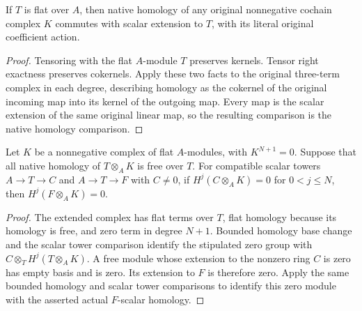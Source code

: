 \begin{lemma}
\label{lem:relative-arithmetic-flat-scalar-homology}
\leanok
If $T$ is flat over $A$, then native homology of any original nonnegative
cochain complex $K$ commutes with scalar extension to $T$, with its
literal original coefficient action.
\end{lemma}
\begin{proof}
Tensoring with the flat $A$-module $T$ preserves kernels. Tensor right
exactness preserves cokernels. Apply these two facts to the original
three-term complex in each degree, describing homology as the cokernel
of the original incoming map into its kernel of the outgoing map.
Every map is the scalar extension of the same original linear map,
so the resulting comparison is the native homology comparison.
\end{proof}

\begin{theorem}
\label{thm:relative-arithmetic-free-scalar-homology}
\leanok
Let $K$ be a nonnegative complex of flat $A$-modules, with $K^{N+1}=0$.
Suppose that all native homology of $T\otimes_A K$ is free over $T$.
For compatible scalar towers $A\to T\to C$ and $A\to T\to F$ with
$C\ne0$, if $H^j(C\otimes_A K)=0$ for $0<j\leq N$, then
$H^j(F\otimes_A K)=0$.
\end{theorem}
\begin{proof}
The extended complex has flat terms over $T$, flat homology because its
homology is free, and zero term in degree $N+1$. Bounded homology base
change and the scalar tower comparison identify the stipulated zero
group with $C\otimes_T H^j(T\otimes_A K)$. A free module whose extension
to the nonzero ring $C$ is zero has empty basis and is zero. Its extension
to $F$ is therefore zero. Apply the same bounded homology and scalar
tower comparisons to identify this zero module with the asserted actual
$F$-scalar homology.
\end{proof}

